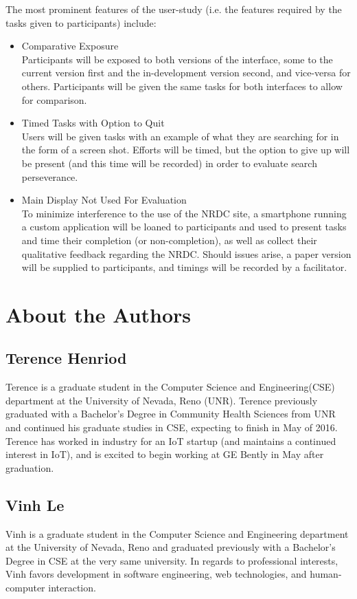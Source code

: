 \documentclass{article}
\begin{document}
The most prominent features of the user-study (i.e. the features required by the tasks given to participants) include:
\begin{itemize}
\item Comparative Exposure \\
Participants will be exposed to both versions of the interface, some to the current version first and the in-development version second, and vice-versa for others. Participants will be given the same tasks for both interfaces to allow for comparison.

\item Timed Tasks with Option to Quit \\
Users will be given tasks with an example of what they are searching for in the form of a screen shot. Efforts will be timed, but the option to give up  will be present (and this time will be recorded) in order to evaluate search perseverance.

\item Main Display Not Used For Evaluation \\
To minimize interference to the use of the NRDC site, a smartphone running a custom application will be loaned to participants and used to present tasks and time their completion (or non-completion), as well as collect their qualitative feedback regarding the NRDC. Should issues arise, a paper version will be supplied to participants, and timings will be recorded by a facilitator.
\end{itemize}

%
%
\section{About the Authors}
%
\subsection{Terence Henriod}

Terence is a graduate student in the Computer Science and Engineering(CSE) department at the University of Nevada, Reno (UNR). Terence previously graduated with a Bachelor's Degree in Community Health Sciences from UNR and continued his graduate studies in CSE, expecting to finish in May of 2016. Terence has worked in industry for an IoT startup (and maintains a continued interest in IoT), and is excited to begin working at GE Bently in May after graduation.

%
\subsection{Vinh Le}

Vinh is a graduate student in the Computer Science and Engineering department at the University of Nevada, Reno and graduated previously with a Bachelor's Degree in CSE at the very same university. In regards to professional interests, Vinh favors development in software engineering, web technologies, and human-computer interaction.

%
%
\printbibliography
\end{document}
